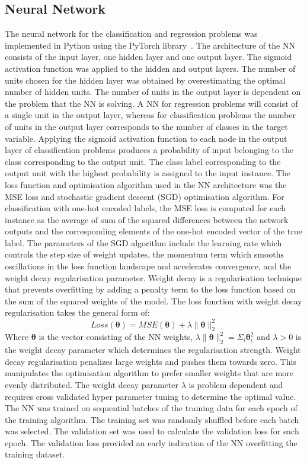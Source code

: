 \documentclass[conference]{IEEEtran}
\begin{document}
	\subsection{Neural Network}
	The neural network for the classification and regression problems was implemented in Python using the PyTorch library~\cite{paszke2019pytorch}. The architecture of the NN consists of the input layer, one hidden layer and one output layer. The sigmoid activation function was applied to the hidden and output layers. The number of units chosen for the hidden layer was obtained by overestimating the optimal number of hidden units. The number of units in the output layer is dependent on the problem that the NN is solving. A NN for regression problems will consist of a single unit in the output layer, whereas for classification problems the number of units in the output layer corresponds to the number of classes in the target variable. Applying the sigmoid activation function to each node in the output layer of classification problems produces a probability of input belonging to the class corresponding to the output unit. The class label corresponding to the output unit with the highest probability is assigned to the input instance. The loss function and optimisation algorithm used in the NN architecture was the MSE loss and stochastic gradient descent (SGD) optimisation algorithm. For classification with one-hot encoded labels, the MSE loss is computed for each instance as the average of sum of the squared differences between the network outputs and the corresponding elements of the one-hot encoded vector of the true label. The parameters of the SGD algorithm include the learning rate which controls the step size of weight updates, the momentum term which smooths oscillations in the loss function landscape and accelerates convergence, and the weight decay regularisation parameter. Weight decay is a regularisation technique that prevents overfitting by adding a penalty term to the loss function based on the sum of the squared weights of the model. The loss function with weight decay regularisation takes the general form of:
	$$
	Loss(\boldsymbol{\theta}) = MSE(\boldsymbol{\theta}) + \lambda\lVert\boldsymbol{\theta}\lVert_2^2
	$$
	Where $\boldsymbol{\theta}$ is the vector consisting of the NN weights, $\lambda\lVert\boldsymbol{\theta}\lVert_2^2=\Sigma_{i}\boldsymbol{\theta}_i^2$ and $\lambda > 0$ is the weight decay parameter which determines the regularisation strength. Weight decay regularisation penalizes large weights and pushes them towards zero. This manipulates the optimisation algorithm to prefer smaller weights that are more evenly distributed. The weight decay parameter $\lambda$ is problem dependent and requires cross validated hyper parameter tuning to determine the optimal value. The NN was trained on sequential batches of the training data for each epoch of the training algorithm. The training set was randomly shuffled before each batch was selected. The validation set was used to calculate the validation loss for each epoch. The validation loss provided an early indication of the NN overfitting the training dataset.
	
\end{document}
